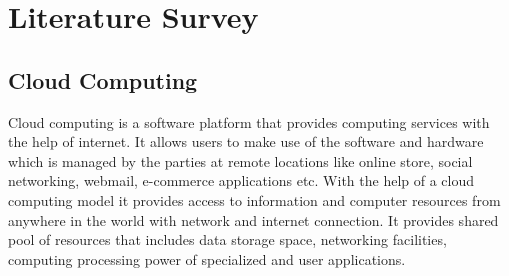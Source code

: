 \chapter{Literature Survey}

\section{Cloud Computing}

\par Cloud computing is a software platform that provides computing services with the help of internet. It allows users to make use of the software and hardware which is managed by the parties at remote locations like online store, social networking, webmail, e-commerce applications etc. With the help of a cloud computing model it provides access to information and computer resources from anywhere in the world with network and internet connection. It provides shared pool of resources that includes data storage space, networking facilities, computing processing power of specialized and user applications\cite{deploy}.%

